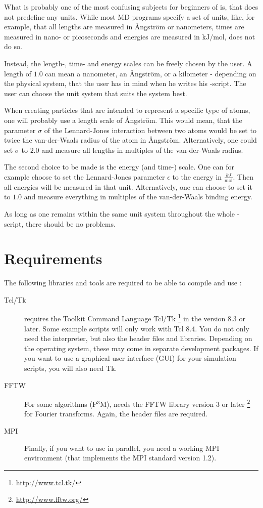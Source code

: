 What is probably one of the most confusing subjects for beginners of
\es is, that \es does not predefine any units.  While most MD programs
specify a set of units, like, for example, that all lengths are
measured in \AA ngstr\"om or nanometers, times are measured in nano-
or picoseconds and energies are measured in $\mathrm{kJ/mol}$, \es
does not do so.

Instead, the length-, time- and energy scales can be freely chosen by
the user.  A length of $1.0$ can mean a nanometer, an \AA ngstr\"om,
or a kilometer - depending on the physical system, that the user has
in mind when he writes his \es-script.  The user can choose the unit
system that suits the system best.

When creating particles that are intended to represent a specific type
of atoms, one will probably use a length scale of \AA ngstr\"om.  This
would mean, that \eg the parameter $\sigma$ of the Lennard-Jones
interaction between two atoms would be set to twice the van-der-Waals
radius of the atom in \AA ngstr\"om.  Alternatively, one could set
$\sigma$ to $2.0$ and measure all lengths in multiples of the
van-der-Waals radius.

The second choice to be made is the energy (and time-) scale.  One can
for example choose to set the Lennard-Jones parameter $\epsilon$ to
the energy in $\frac{kJ}{\mathrm{mol}}$.  Then all energies will be
measured in that unit.  Alternatively, one can choose to set it to
$1.0$ and measure everything in multiples of the van-der-Waals binding
energy.

As long as one remains within the same unit system throughout the
whole \es-script, there should be no problems.

\section{Requirements}
\label{sec:requirements}

The following libraries and tools are required to be able to compile
and use \es:

\begin{description}
\item[Tcl/Tk]  \es{} requires the Toolkit Command
  Language Tcl/Tk \footnote{\url{http://www.tcl.tk/}} in the version
  8.3 or later.  Some example scripts will only work with Tcl 8.4. You
  do not only need the interpreter, but also the header files and
  libraries.  Depending on the operating system, these may come in
  separate development packages. If you want to use a graphical user
  interface (GUI) for your simulation scripts, you will also need Tk.
  
\item[FFTW]  For some algorithms (\eg P$^3$M), \es needs
  the FFTW library version 3 or later
  \footnote{\url{http://www.fftw.org/}} for Fourier transforms.
  Again, the header files are required.
  
\item[MPI]  Finally, if you want to use \es in parallel,
  you need a working MPI environment (that implements the MPI standard
  version 1.2).
\end{description}


